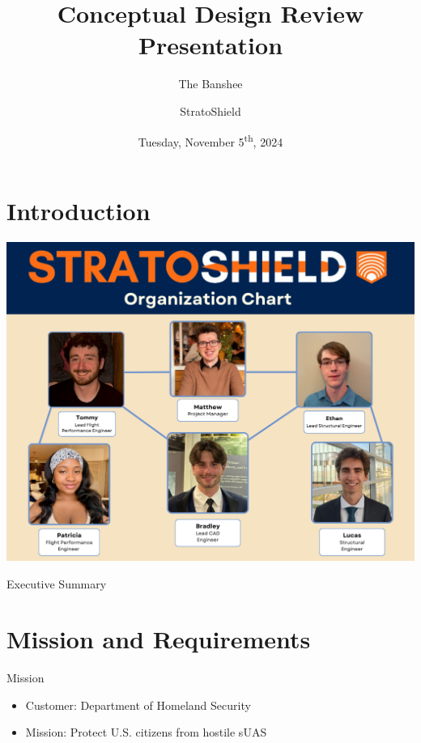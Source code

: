\documentclass{beamer}
\title[Conceptual Design Review]{Conceptual Design Review Presentation}
\subtitle{The Banshee}
\author{StratoShield}
\institute{Iowa State University}
\date{Tuesday, November 5\textsuperscript{th}, 2024}
\newcommand{\setpresentername}[1]{\renewcommand{\presentername}{#1}}
\newcommand{\setpresentertitle}[1]{\renewcommand{\presentertitle}{#1}}
\newcommand{\presentername}{}
\newcommand{\presentertitle}{}
\newif\ifshowpresenterbox
\begin{document}
    \showpresenterboxfalse
    \begin{frame}
        \titlepage
    \end{frame}
    \showpresenterboxtrue

    \section{Introduction}
    
    \setpresentername{Matthew Mehrtens}
    \setpresentertitle{Project Manager}
    
    \begin{frame}
        \centering
        \includegraphics[width=\linewidth]{figures/StratoShield Organization Chart v1.1.0.png}
    \end{frame}
    
    \begin{frame}{Executive Summary}
        \tableofcontents
    \end{frame}
    
    \section{Mission and Requirements}

    \begin{frame}{Mission}
        \begin{itemize}
            \item Customer: Department of Homeland Security
            \item Mission: Protect U.S. citizens from hostile sUAS
        \end{itemize}
    \end{frame}
\end{document}
